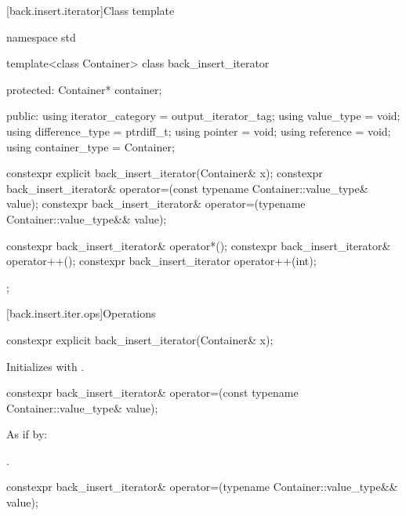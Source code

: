 [back.insert.iterator]{Class template }

%
\begin{codeblock}
namespace std {
  template<class Container>
  class back_insert_iterator {
  protected:
    Container* container;

  public:
    using iterator_category = output_iterator_tag;
    using value_type        = void;
    using difference_type   = ptrdiff_t;
    using pointer           = void;
    using reference         = void;
    using container_type    = Container;

    constexpr explicit back_insert_iterator(Container& x);
    constexpr back_insert_iterator& operator=(const typename Container::value_type& value);
    constexpr back_insert_iterator& operator=(typename Container::value_type&& value);

    constexpr back_insert_iterator& operator*();
    constexpr back_insert_iterator& operator++();
    constexpr back_insert_iterator  operator++(int);
  };
}
\end{codeblock}

[back.insert.iter.ops]{Operations}

%
\begin{itemdecl}
constexpr explicit back_insert_iterator(Container& x);
\end{itemdecl}

\begin{itemdescr}
\pnum
\effects
Initializes
with .
\end{itemdescr}

%
\begin{itemdecl}
constexpr back_insert_iterator& operator=(const typename Container::value_type& value);
\end{itemdecl}

\begin{itemdescr}
\pnum
\effects
As if by: 

\pnum
\returns
{}.
\end{itemdescr}

%
\begin{itemdecl}
constexpr back_insert_iterator& operator=(typename Container::value_type&& value);
\end{itemdecl}

